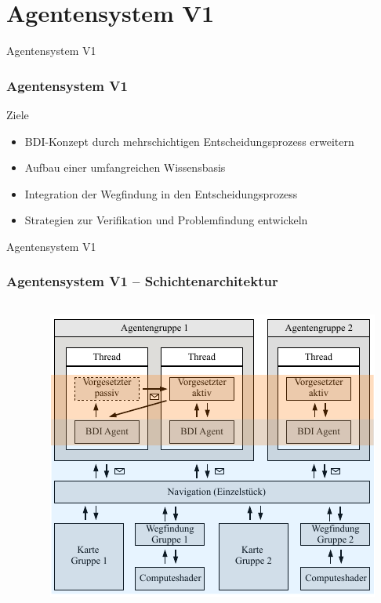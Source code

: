 \documentclass[aspectratio=169]{beamer} %
\begin{document}
\section{Agentensystem V1}
\begin{frame}{Agentensystem V1}
\frametitle{Agentensystem V1}
\begin{block}{Ziele}
\begin{itemize}
	\item BDI-Konzept durch mehrschichtigen Entscheidungsprozess erweitern
	\item Aufbau einer umfangreichen Wissensbasis
	\item Integration der Wegfindung in den Entscheidungsprozess
	\item Strategien zur Verifikation und Problemfindung entwickeln
\end{itemize}
\end{block}
\end{frame}

\begin{frame}{Agentensystem V1}
\frametitle{Agentensystem V1 -- Schichtenarchitektur}
\begin{columns}
\begin{column}{0.3\textwidth}
	\\[2ex]

\end{column}
\begin{column}{0.5\textwidth}
    \begin{center}
	\vspace{-6mm}
     \includegraphics[scale=1.1]{./figures/Architekturdiagramm.pdf}    
     \end{center}
\end{column}
\end{columns}
\end{frame}
\end{document}
